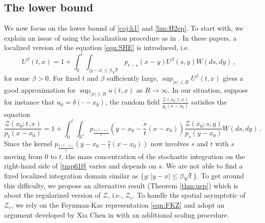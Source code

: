 \documentclass[12pt,reqno]{amsart}
\theoremstyle{remark}
\newcommand{\1}{\mathbf{1}}
\def\RR{\mathbb{R}}
\def\Z{\mathcal{Z}}
\begin{document}
\subsection{The lower bound} %
\label{sub:low}
	We now focus on the lower bound of \eqref{coj:h1} and \eqref{lim:H2ep}. To start with, we explain an issue of using the localization procedure as in \cites{MR3474477,MR3098071}. In these papers, a localized version of the equation \eqref{eqn:SHE} is introduced, i.e.
	\begin{equation}\label{eq:U local}
	U^{\beta}(t,x) = 1 + \int_0^t \int_{|y-x|\leq \beta \sqrt{t}} p_{t-s}(x-y) U^{\beta}(s,y)W(ds,dy)\,,
	\end{equation}
for some $\beta>0$. For fixed $t$ and $\beta$ sufficiently large, $\sup_{|x|\le R} U^\beta(t,x)$ gives a good approximation for $\sup_{|x|\le R}u(t,x)$ as $R\to\infty$. In our situation, suppose for instance that $u_0=\delta(\cdot-x_0)$, the random field $\frac{\Z(x_0; t,x)}{p_t(x-x_0)}$ satisfies the equation 
\begin{equation}\label{tmp610}
\frac{\Z(x_0; t,x)}{p_{t}(x-x_0)} = 1 + \int_0^t \int_{\RR^{\ell}} p_{\frac{s(t-s)}{t}}\left( y-x_0-\frac{s}{t}(x-x_0) \right) \frac{\Z(x_0; s,y)}{p_s(y-x_0)}W(ds,dy)\,.
\end{equation}	
Since the  kernel $p_{\frac{s(t-s)}{t}}\left( y-x_0-\frac{s}{t}(x-x_0)\right)$ now involves $s$ and $t$ with $s$ moving from $0$ to $t$, the mass concentration of the stochastic integration on the right-hand side of \eqref{tmp610} varies and depends on $s$. We are not able to find a fixed localized integration domain similar as $\{y:|y-x|\leq \beta\sqrt{t}\}$. To get around this difficulty, we propose an alternative result (Theorem \ref{thm:uep}) which is about the regularized version of $\Z$, i.e., $\Z_{\epsilon}$. 
	To handle the spatial asymptotic of $\Z_ {\epsilon}$, we rely on the Feynman-Kac representation \eqref{eqn:FKZ} and adopt an argument developed by Xia Chen in \cite{MR3474477} with an additional scaling procedure. 
\end{document}

